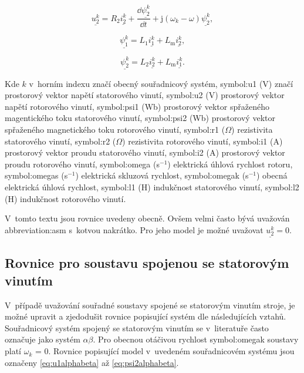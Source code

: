 \documentclass[a4paper, twoside, 11pt]{article}
\begin{document}
    \begin{equation}
        \underline{u_{2}^{k}} = R_2 \underline{i_2^{k}} + \frac{\dd{\underline{\psi_2^{k}}}}{\dd{t}} + \text{j} (\omega_k - \omega) \underline{\psi_2^{k}},
    \end{equation}

    \begin{equation}
        \underline{\psi_1^{k}} = L_1 \underline{i_1^{k}} + L_\text{m} \underline{i_2^{k}},
    \end{equation}

    \begin{equation}
        \underline{\psi_2^{k}} = L_2 \underline{i_2^{k}} + L_\text{m} \underline{i_1^{k}}.
    \end{equation}

    Kde $k$ v~horním indexu značí obecný souřadnicový systém, \gls{symbol:u1} (V) značí prostorový vektor napětí statorového vinutí, \gls{symbol:u2} (V) prostorový vektor napětí rotorového vinutí, \gls{symbol:psi1} (Wb) prostorový vektor spřaženého magentického toku statorového vinutí, \gls{symbol:psi2} (Wb) prostorový vektor spřaženého magnetického toku rotorového vinutí, \gls{symbol:r1} ($\Omega$) rezistivita statorového vinutí, \gls{symbol:r2} ($\Omega$) rezistivita rotorového vinutí, \gls{symbol:i1} (A) prostorový vektor proudu statorového vinutí, \gls{symbol:i2} (A) prostorový vektor proudu rotorového vinutí, \gls{symbol:omega} (s$^{-1}$) elektrická úhlová rychlost rotoru, \gls{symbol:omegas} (s$^{-1}$) elektrická skluzová rychlost, \gls{symbol:omegak} (s$^{-1}$) obecná elektrická úhlová rychlost, \gls{symbol:l1} (H) indukčnost statorového vinutí, \gls{symbol:l2} (H) indukčnost rotorového vinutí.\par

    V~tomto textu jsou rovnice uvedeny obecně. Ovšem velmi často bývá uvažován \gls{abbreviation:asm} s~kotvou nakrátko. Pro jeho model je možné uvažovat $\underline{u_{2}^k} = 0$.\par


    \subsection{Rovnice pro soustavu spojenou se statorovým vinutím}
    V~případě uvažování souřadné soustavy spojené se statorovým vinutím stroje, je možné upravit a zjedodušit rovnice popisující systém dle následujících vztahů. Souřadnicový systém spojený se statorovým vinutím se v~literatuře často označuje jako systém $\alpha\beta$. Pro obecnou otáčivou rychlost \gls{symbol:omegak} soustavy platí $\omega_k$ = 0. Rovnice popisující model v~uvedeném souřadnicovém systému jsou označeny \ref{eq:u1alphabeta} až \ref{eq:psi2alphabeta}.
\end{document}
